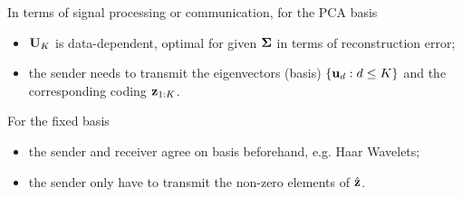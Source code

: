 \documentclass[../main.tex]{subfiles}
\begin{document}
\par In terms of signal processing or communication, for the PCA basis
\begin{itemize}
	\item ${\bf U}_K$ is data-dependent, optimal for given ${\bf \Sigma}$ in terms of reconstruction error;
	\item the sender needs to transmit the eigenvectors (basis) $\{{\bf u}_d:d\leq K\}$ and the corresponding coding ${\bf z}_{1:K}$.
\end{itemize}
For the fixed basis
\begin{itemize}
	\item the sender and receiver agree on basis beforehand, e.g. Haar Wavelets;
	\item the sender only have to transmit the non-zero elements of $\hat{\bf z}$.
\end{itemize}
\end{document}
